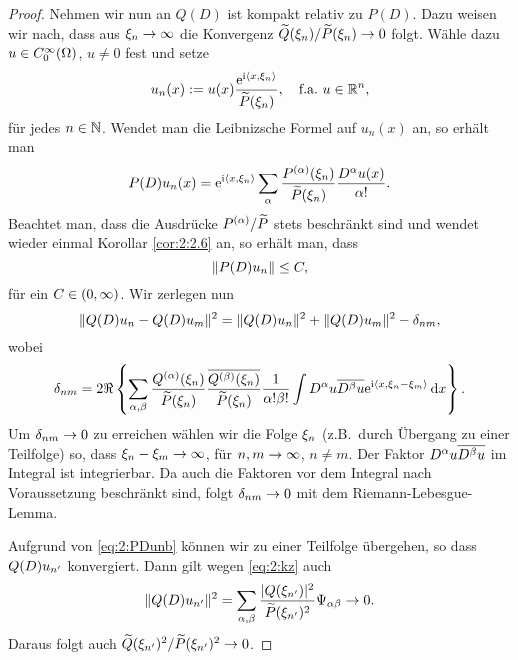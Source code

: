 \begin{proof}
Nehmen wir nun an $Q(D)$ ist kompakt relativ zu $P(D)$.
Dazu weisen wir nach, dass aus $\xi_n\to\infty$ die Konvergenz $\widetilde{Q}(\xi_n)/\widetilde{P}(\xi_n)\to0$ folgt.
Wähle dazu $u\in C^\infty_0(\Omega)$, $u\neq0$ fest und setze
\begin{equation}
u_n(x):=u(x)\frac{\mathrm e^{\mathrm i\langle x,\xi_n\rangle}}{\widetilde{P}(\xi_n)},\quad\text{f.a.}~u\in\mathbb R^n,
\end{equation}
für jedes $n\in\mathbb N$.
Wendet man die Leibnizsche Formel auf $u_n(x)$ an,
so erhält man
\begin{equation}
P(D)u_n(x)=\mathrm e^{\mathrm i\langle x,\xi_n\rangle}\sum_\alpha\frac{P^{(\alpha)}(\xi_n)}{\widetilde{P}(\xi_n)}\frac{D^\alpha u(x)}{\alpha!}.
\end{equation}
Beachtet man, dass die Ausdrücke $P^{(\alpha)}/\widetilde{P}$ stets beschränkt sind
und wendet wieder einmal Korollar \ref{cor:2:2.6} an,
so erhält man, dass
\begin{equation}\label{eq:2:PDunb}
\lVert P(D)u_n\rVert\leq C,
\end{equation}
für ein $C\in(0,\infty)$.
Wir zerlegen nun
\begin{equation}\label{eq:2:kz}
\lVert Q(D)u_n-Q(D)u_m\rVert^2=\lVert Q(D)u_n\rVert^2+\lVert Q(D)u_m\rVert^2-\delta_{nm},
\end{equation}
wobei
\begin{equation}
\delta_{nm}=2\Re\left\{\sum_{\alpha,\beta}\frac{Q^{(\alpha)}(\xi_n)}{\widetilde{P}(\xi_n)}\frac{\overline{Q^{(\beta)}(\xi_n)}}{\widetilde{P}(\xi_n)}
\frac1{\alpha!\beta!}\int D^\alpha u\overline{D^\beta u}\mathrm e^{\mathrm i\langle x,\xi_n-\xi_m\rangle}\,\mathrm d x\right\}.
\end{equation}
Um $\delta_{nm}\to0$ zu erreichen wählen wir die Folge $\xi_n$ (z.B.~durch Übergang zu einer Teilfolge) so,
dass $\xi_n-\xi_m\to\infty$, für $n,m\to\infty$, $n\neq m$.
Der Faktor $D^\alpha u\overline{D^\beta u}$ im Integral ist integrierbar.
Da auch die Faktoren vor dem Integral nach Voraussetzung beschränkt sind,
folgt $\delta_{nm}\to0$ mit dem Riemann-Lebesgue-Lemma.

Aufgrund von \eqref{eq:2:PDunb} können wir zu einer Teilfolge übergehen,
so dass $Q(D)u_{n^\prime}$ konvergiert.
Dann gilt wegen \eqref{eq:2:kz} auch
\begin{equation}
\lVert Q(D)u_{n^\prime}\rVert^2=\sum_{\alpha,\beta}\frac{\lvert Q(\xi_{n^\prime})\rvert^2}{\widetilde{P}(\xi_{n^\prime})^2}\Psi_{\alpha\beta}\to0.
\end{equation}
Daraus folgt auch $\widetilde{Q}(\xi_{n^\prime})^2/\widetilde{P}(\xi_{n^\prime})^2\to0$.
\end{proof}
